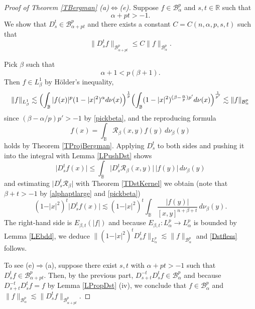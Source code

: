 \documentclass[10pt,a4paper]{amsart}
\begin{document}
\begin{proof}[Proof of Theorem \ref{TBergman} (a)$\Leftrightarrow$(e)]
Suppose $f\in\mathcal B^p_\alpha$ and $s,t\in\mathbb R$ such that
\begin{equation}\label{alphaptlarge}
\alpha+pt>-1.
\end{equation}
We show that $D^t_s\in\mathcal B^p_{\alpha+pt}$ and
there exists a constant $C=C(n,\alpha,p,s,t)$ such that
\begin{equation}\label{Dstfless}
\|D^t_s f\|_{\mathcal B^p_{\alpha+pt}}
\le C \|f\|_{\mathcal B^p_\alpha}.
\end{equation}

Pick $\beta$ such that
\begin{equation}\label{pickbeta}
\alpha+1<p(\beta+1).
\end{equation}
Then $f\in L^1_\beta$ by H\"{o}lder's inequality,
\begin{equation}\label{Holderin}
\|f\|_{L^1_\beta}
\lesssim \Bigl(\int_{\mathbb B}\vert f(x)\vert^p(1-\vert x\vert^2)^\alpha
d\nu(x)\Bigr)^{\frac{1}{p}}
\Bigl(\int_{\mathbb B} (1-\vert x\vert^2)^{(\beta-\frac{\alpha}{p})p'}
d\nu(x)\Bigr)^{\frac{1}{p'}}
\lesssim \|f\|_{\mathcal B^p_\alpha}
\end{equation}
since $(\beta-\alpha/p)p'>-1$ by \eqref{pickbeta},
and the reproducing formula
\begin{equation}\label{reproducing}
f(x)=\int_{\mathbb B} \mathcal R_\beta(x,y)f(y)\,d\nu_\beta(y)
\end{equation}
holds by Theorem \ref{TProjBergman}.
Applying $D^t_s$ to both sides and pushing it into the integral
with Lemma \ref{LPushDst} shows
\begin{equation*}
\vert D^t_s f(x)\vert \le\int_{\mathbb B}
\vert D^t_s \mathcal R_\beta(x,y)\vert\, \vert f(y)\vert\,d\nu_\beta(y)
\end{equation*}
and estimating $\vert D^t_s \mathcal R_\beta\vert$ with Theorem \ref{TDstKernel}
we obtain (note that $\beta+t>-1$ by \eqref{alphaptlarge} and \eqref{pickbeta})
\begin{equation*}
(1-\vert x\vert^2)^t\vert D^t_s f(x)\vert
\lesssim (1-\vert x\vert^2)^t\int_{\mathbb B}
\frac{\vert f(y)\vert}{[x,y]^{n+\beta+t}}\,d\nu_\beta(y).
\end{equation*}
The right-hand side is $E_{\beta,t}(\vert f\vert)$ and because
$E_{\beta,t}\colon L^p_\alpha\to L^p_\alpha$ is bounded by Lemma \ref{LEbdd},
we deduce
$\|(1-\vert x\vert^2)^t D^t_s f\|_{L^p_\alpha}\lesssim \|f\|_{\mathcal B^p_\alpha}$
and \eqref{Dstfless} follows.

To see (e)$\Rightarrow$(a), suppose there exist $s,t$ with $\alpha+pt>-1$
such that $D^t_s f\in\mathcal B^p_{\alpha+pt}$.
Then, by the previous part, $D^{-t}_{s+t} D^t_s f\in\mathcal B^p_\alpha$
and because $D^{-t}_{s+t} D^t_s f=f$ by Lemma \ref{LPropDst} (iv), we conclude that
$f\in\mathcal B^p_\alpha$ and
$\|f\|_{\mathcal B^p_\alpha}\lesssim \|D^t_s f\|_{\mathcal B^p_{\alpha+pt}}$.
\end{proof}
\end{document}

